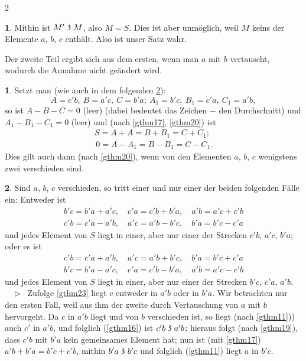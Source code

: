 \documentclass[leqno,hidelinks,10pt]{article}
\theoremstyle{definition}
\newtheorem{satz}{\protect\satzname}
\newtheorem*{zusatz}{\protect\zusatzname}
\newcommand{\satzname}{}
\newcommand{\zusatzname}{}
\renewcommand{\satzname}{\hspace{-4pt}.\ Satz}%
\renewcommand{\zusatzname}{Zusatz}%
\renewcommand{\satzname}{\hspace{-4pt}.\ Theorem}%
\renewcommand{\zusatzname}{Corollary}%
\newcommand\Beweis{\medskip \newline $ \phantom{'.'} \rhd \ $}%
\newcommand\TeilVon{\mathrel{\raisebox{0.45ex}{$\mathfrak{3}$}}}
\newcommand{\sref}[1]{\underline{\ref{#1}}}%
\begin{document}
\begin{paracol}{2}
\begin{leftcolumn}
\begin{satz}
Mithin ist $M' \TeilVon M$, also $M = S$. Dies ist aber unmöglich, weil $M$ keins
der Elemente $a,\, b,\, c$ enthält. Also ist unser Satz wahr.

Der zweite Teil ergibt sich aus dem ersten, wenn man $a$ mit $b$ vertauscht,
wodurch die Annahme nicht geändert wird.
\end{satz}

\begin{zusatz}\label{zusatz1}
Setzt man (wie auch in dem folgenden \sref{gthm25}):
\[
    A = c'b,\ B = a'c,\ C = b'a;\  A_1 = b'c,\ B_1 = c'a,\ C_1 = a'b,
\]
so ist $A - B - C = 0$ (leer) (dabei bedeutet das Zeichen $-$ den Durchschnitt)
 und $A_1 - B_1 - C_1 = 0$ (leer) und (nach \sref{gthm17}, \sref{gthm20}) ist
\begin{gather*}
    S = A + A = B + B_1 = C + C_1; \\
    \,0 = A - A_1 = B - B_1 = C - C_1.
\end{gather*}
Dies gilt auch dann (nach \sref{gthm20}), wenn von den Elementen $a$, $b$, $c$
wenigstens zwei verschieden sind.
\end{zusatz}

\begin{satz}\label{gthm25}
Sind $a$, $b$, $c$ verschieden, so tritt einer und nur einer der beiden
folgenden Fälle ein: Entweder ist
\begin{gather*}
    b'c = b'a + a'c, \quad c'a = c'b + b'a, \quad a'b = a'c + c'b \\
    c'b = c'a - a'b, \quad a'c = a'b - b'c, \quad b'a = b'c - c'a
\end{gather*}
und jedes Element von $S$ liegt in einer, aber nur einer der Strecken
$c'b$, $a'c$, $b'a$; oder es ist
\begin{gather*}
    c'b = c'a + a'b, \quad a'c = a'b + b'c, \quad b'a = b'c + c'a \\
    b'c = b'a - a'c, \quad c'a = c'b - b'a, \quad a'b = a'c - c'b
\end{gather*}
und jedes Element von $S$ liegt in einer, aber nur einer der Strecken
$b'c$, $c'a$, $a'b$.
\Beweis
Zufolge \sref{gthm23} liegt $c$ entweder in $a'b$ oder in $b'a$. Wir betrachten
nur den ersten Fall, weil aus ihm der zweite durch Vertauschung von $a$ mit $b$
hervorgeht. Da $c$ in $a'b$ liegt und von $b$ verschieden ist, so liegt
(nach \sref{gthm11})) auch $c'$ in $a'b$, und folglich (\sref{gthm16}) ist
$c'b \TeilVon a'b$; hieraus folgt (nach \sref{gthm19}), dass $c'b$ mit $b'a$ kein
gemeinsames Element hat; nun ist (mit \sref{gthm17}) $a'b + b'a = b'c + c'b$,
mithin $b'a \TeilVon b'c$ und folglich (\sref{gthm11}) liegt $a$ in $b'c$.


\end{satz}
\end{leftcolumn}
\end{paracol}
\end{document}

